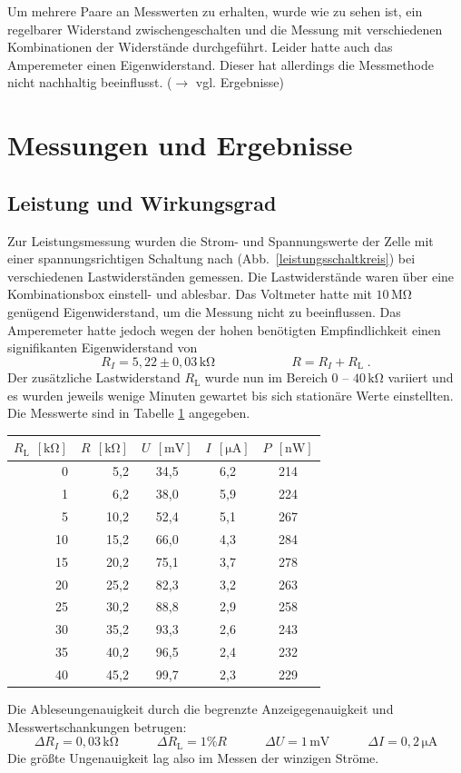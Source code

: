 \documentclass[11pt]{scrartcl}
\newcommand{\unit}[1]{\ensuremath{\,\mathrm{#1}}} %
\begin{document}
Um mehrere Paare an Messwerten zu erhalten, wurde wie zu sehen ist, ein regelbarer Widerstand zwischengeschalten und die Messung mit verschiedenen Kombinationen der Widerst\"ande durchgef\"uhrt. Leider hatte auch das Amperemeter einen Eigenwiderstand. Dieser hat allerdings die Messmethode nicht nachhaltig beeinflusst. ($\rightarrow$ vgl. Ergebnisse) %





\section{Messungen und Ergebnisse}
\subsection{Leistung und Wirkungsgrad}
Zur Leistungsmessung wurden die Strom- und Spannungswerte der Zelle mit einer spannungsrichtigen Schaltung nach (Abb.~\ref{leistungsschaltkreis}) bei verschiedenen Lastwiderständen gemessen. Die Lastwiderstände waren über eine Kombinationsbox einstell- und ablesbar. Das Voltmeter hatte mit $10\unit{M\Omega}$ genügend Eigenwiderstand, um die Messung nicht zu beeinflussen. Das Amperemeter hatte jedoch wegen der hohen benötigten Empfindlichkeit einen signifikanten Eigenwiderstand von
\[
R_I = 5,22\pm 0,03 \unit{k\Omega}
\qquad\qquad\qquad
R = R_I+R_{\text{L}}\;.
\]
Der zusätzliche Lastwiderstand $R_{\text{L}}$ wurde nun im Bereich 0 -- $40\unit{k\Omega}$ variiert und es wurden jeweils wenige Minuten gewartet bis sich stationäre Werte einstellten. Die Messwerte sind in Tabelle \ref{leistungsmesstabelle} angegeben.
\begin{table}[ht]
\label{leistungsmesstabelle}
\begin{center}
\begin{tabular}{rr|ccc}
$R_{\text{L}}\; \unit{[k\Omega]}$ &
$R\; \unit{[k\Omega]}$ &
$U\; \unit{[mV]}$ &
$I\; \unit{[\mu A]}$ &
$P\; \unit{[nW]}$ \\
\hline
0	& 5,2	& 34,5	& 6,2	& 214 \\
1	& 6,2	& 38,0	& 5,9	& 224 \\
5	& 10,2	& 52,4	& 5,1	& 267 \\
10	& 15,2	& 66,0	& 4,3	& 284 \\
15	& 20,2	& 75,1	& 3,7	& 278 \\
20	& 25,2	& 82,3	& 3,2	& 263 \\
25	& 30,2	& 88,8	& 2,9	& 258 \\
30	& 35,2	& 93,3	& 2,6	& 243 \\
35	& 40,2	& 96,5	& 2,4	& 232 \\
40	& 45,2	& 99,7	& 2,3	& 229
\end{tabular}
\end{center}
\end{table}
Die Ableseungenauigkeit durch die begrenzte Anzeigegenauigkeit und Messwertschankungen betrugen:
\[
\Delta R_I = 0,03\unit{k\Omega}
\qquad\quad
\Delta R_{\text{L}} = 1\% R
\qquad\quad
\Delta U = 1\unit{mV}
\qquad\quad
\Delta I = 0,2\unit{\mu A}
\]
Die größte Ungenauigkeit lag also im Messen der winzigen Ströme.
\end{document}
